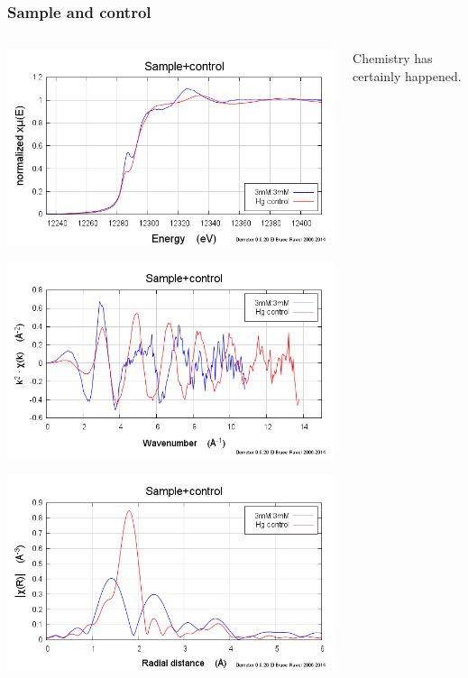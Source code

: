 \documentclass[10pt, xcolor=x11names, compress]{beamer}
\begin{document}
\begin{frame}
  \frametitle{Sample and control}
  \begin{columns}
    \begin{column}{0.4\linewidth}
      \includegraphics[width=\linewidth]{images/both_e.png}

      \includegraphics[width=\linewidth]{images/both_k.png}

      \includegraphics[width=\linewidth]{images/both_r.png}
    \end{column}
    \begin{column}{0.6\linewidth}
      Chemistry has certainly happened.


\end{column}
\end{columns}
\end{frame}
\end{document}
